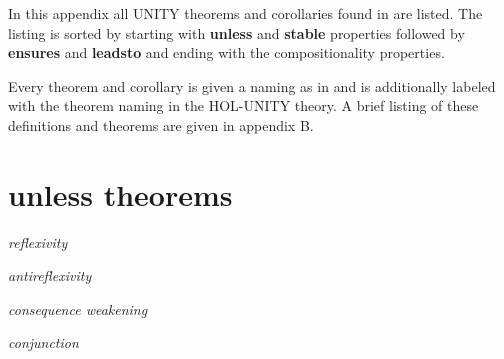 
In this appendix all UNITY theorems and corollaries found in \cite{CM88} are
listed.  The listing is sorted by starting with {\bf unless} and {\bf stable}
properties followed by {\bf ensures} and {\bf leadsto} and ending with the
compositionality properties.

Every theorem and corollary is given a naming as in \cite{CM88} and is
additionally labeled with the theorem naming in the HOL-UNITY theory.  A brief
listing of these definitions and theorems are given in appendix B.

\newpage
\section*{{\bf unless} theorems}

{\it reflexivity}


\bigskip
{\it antireflexivity}


\bigskip
{\it consequence weakening}


\bigskip
{\it conjunction}


